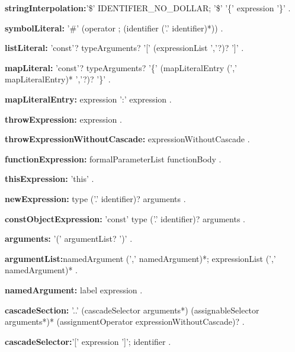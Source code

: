 \begin{grammar}
{\bf stringInterpolation:}'\$' IDENTIFIER_NO_DOLLAR;
      '\$' '\{' expression '\}' %
    .
 \end{grammar}
\begin{grammar}
{\bf symbolLiteral:}
      '\#'  (operator ; (identifier ('.' identifier)*))  .
\end{grammar}
\begin{grammar}
{\bf listLiteral:}
     'const'? typeArguments? '[' (expressionList ','?)? ']'
    .
\end{grammar}
\begin{grammar}
{\bf mapLiteral:}
      'const'?  typeArguments? '\{' (mapLiteralEntry (',' mapLiteralEntry)* ','?)? '\}'
    .

{\bf mapLiteralEntry:}
  expression ':' expression 
    .
\end{grammar}
\begin{grammar}
{\bf throwExpression:}
     \THROW{} expression 
    .
    
   {\bf throwExpressionWithoutCascade:}
     \THROW{} expressionWithoutCascade 
    .
 
 \end{grammar}
\begin{grammar}
{\bf functionExpression:}
    formalParameterList functionBody
    .
 \end{grammar}
\begin{grammar}
{\bf thisExpression:}
      'this'
     .
\end{grammar}
\begin{grammar}
{\bf newExpression:}
\NEW{} type ('.' identifier)? arguments
.
\end{grammar}
\begin{grammar}
{\bf constObjectExpression:}
'const' type ('.' identifier)? arguments
.
\end{grammar}
\begin{grammar}
{\bf arguments:}
      '(' argumentList? ')'
    .

{\bf argumentList:}namedArgument (',' namedArgument)*;
      expressionList (',' namedArgument)*
    .

{\bf namedArgument:}
      label expression %
    .
 \end{grammar}
\begin{grammar}
{\bf cascadeSection:}
      '..' (cascadeSelector arguments*) (assignableSelector arguments*)* (assignmentOperator expressionWithoutCascade)?
      .
     
{\bf cascadeSelector:}'['  expression ']';
      identifier
      .
\end{grammar}
